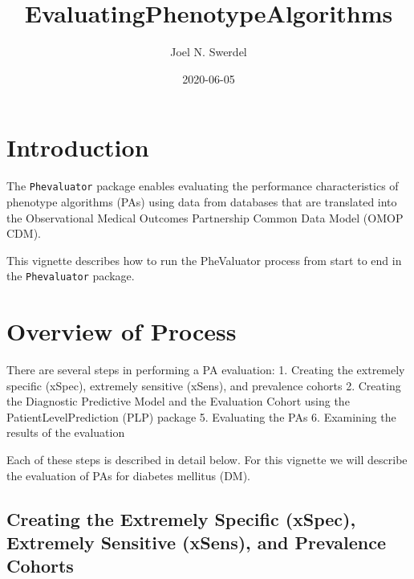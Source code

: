 \documentclass[
]{article}
\title{EvaluatingPhenotypeAlgorithms}
\author{Joel N. Swerdel}
\date{2020-06-05}
\begin{document}
\maketitle

{
\setcounter{tocdepth}{3}
\tableofcontents
}
\newpage

\hypertarget{introduction}{%
\section{Introduction}\label{introduction}}

The \texttt{Phevaluator} package enables evaluating the performance
characteristics of phenotype algorithms (PAs) using data from databases
that are translated into the Observational Medical Outcomes Partnership
Common Data Model (OMOP CDM).

This vignette describes how to run the PheValuator process from start to
end in the \texttt{Phevaluator} package.

\hypertarget{overview-of-process}{%
\section{Overview of Process}\label{overview-of-process}}

There are several steps in performing a PA evaluation: 1. Creating the
extremely specific (xSpec), extremely sensitive (xSens), and prevalence
cohorts 2. Creating the Diagnostic Predictive Model and the Evaluation
Cohort using the PatientLevelPrediction (PLP) package 5. Evaluating the
PAs 6. Examining the results of the evaluation

Each of these steps is described in detail below. For this vignette we
will describe the evaluation of PAs for diabetes mellitus (DM).

\hypertarget{creating-the-extremely-specific-xspec-extremely-sensitive-xsens-and-prevalence-cohorts}{%
\subsection{Creating the Extremely Specific (xSpec), Extremely Sensitive
(xSens), and Prevalence
Cohorts}\label{creating-the-extremely-specific-xspec-extremely-sensitive-xsens-and-prevalence-cohorts}}
\end{document}
